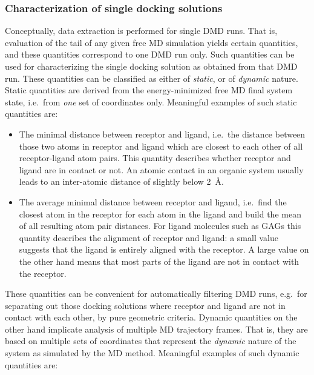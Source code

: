 \subsubsection{Characterization of single docking solutions}

Conceptually, data extraction is performed for single DMD runs. That is,
evaluation of the tail of any given free MD simulation yields certain
quantities, and these quantities correspond to one DMD run only. Such quantities
can be used for characterizing the single docking solution as obtained from that
DMD run. These quantities can be classified as either of \textit{static}, or of
\textit{dynamic} nature. Static quantities are derived from the energy-minimized
free MD final system state, i.e.\ from \textit{one} set of coordinates only.
Meaningful examples of such static quantities are:

\begin{itemize}
\item The minimal distance between receptor and ligand, i.e.\ the distance
between those two atoms in receptor and ligand which are closest to each other
of all receptor-ligand atom pairs. This quantity describes whether receptor and
ligand are in contact or not. An atomic contact in an organic system usually
leads to an inter-atomic distance of slightly below \SI{2}{\angstrom}.
\item The average minimal distance between receptor and ligand, i.e.\ find the
closest atom in the receptor for each atom in the ligand and build the mean of
all resulting atom pair distances. For ligand molecules such as GAGs this
quantity describes the alignment of receptor and ligand: a small value suggests
that the ligand is entirely aligned with the receptor. A large value on the
other hand means that most parts of the ligand are not in contact with the
receptor.
\end{itemize}

These quantities can be convenient for automatically filtering DMD runs, e.g.\
for separating out those docking solutions where receptor and ligand are not in
contact with each other, by pure geometric criteria. Dynamic quantities on the
other hand implicate analysis of multiple MD trajectory frames. That is, they
are based on multiple sets of coordinates that represent the \textit{dynamic}
nature of the system as simulated by the MD method. Meaningful examples of such
dynamic quantities are:


